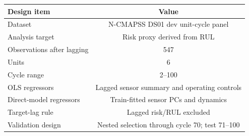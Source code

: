 \begin{tabular}{lc}
\toprule
Design item & Value \\
\midrule
Dataset & N-CMAPSS DS01 dev unit-cycle panel \\
Analysis target & Risk proxy derived from RUL \\
Observations after lagging & 547 \\
Units & 6 \\
Cycle range & 2--100 \\
OLS regressors & Lagged sensor summary and operating controls \\
Direct-model regressors & Train-fitted sensor PCs and dynamics \\
Target-lag rule & Lagged risk/RUL excluded \\
Validation design & Nested selection through cycle 70; test 71--100 \\
\bottomrule
\end{tabular}